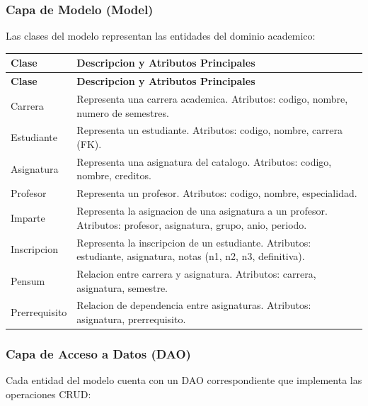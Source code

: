 \documentclass[12pt,a4paper]{article}
\begin{document}
\subsubsection{Capa de Modelo (Model)}

Las clases del modelo representan las entidades del dominio academico:

\begin{longtable}{|p{4cm}|p{10cm}|}
\hline
\rowcolor{udgreen!20}
\textbf{Clase} & \textbf{Descripcion y Atributos Principales} \\
\hline
\endfirsthead
\hline
\rowcolor{udgreen!20}
\textbf{Clase} & \textbf{Descripcion y Atributos Principales} \\
\hline
\endhead
Carrera & Representa una carrera academica. Atributos: codigo, nombre, numero de semestres. \\
\hline
Estudiante & Representa un estudiante. Atributos: codigo, nombre, carrera (FK). \\
\hline
Asignatura & Representa una asignatura del catalogo. Atributos: codigo, nombre, creditos. \\
\hline
Profesor & Representa un profesor. Atributos: codigo, nombre, especialidad. \\
\hline
Imparte & Representa la asignacion de una asignatura a un profesor. Atributos: profesor, asignatura, grupo, anio, periodo. \\
\hline
Inscripcion & Representa la inscripcion de un estudiante. Atributos: estudiante, asignatura, notas (n1, n2, n3, definitiva). \\
\hline
Pensum & Relacion entre carrera y asignatura. Atributos: carrera, asignatura, semestre. \\
\hline
Prerrequisito & Relacion de dependencia entre asignaturas. Atributos: asignatura, prerrequisito. \\
\hline
\end{longtable}

\subsubsection{Capa de Acceso a Datos (DAO)}

Cada entidad del modelo cuenta con un DAO correspondiente que implementa las operaciones CRUD:
\end{document}
